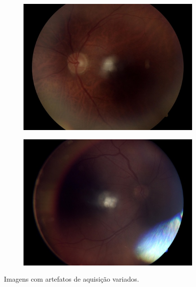 \documentclass[12pt]{article}
\begin{document}
\begin{figure}
\begin{subfigure}[b]{0.2\textwidth}
        \label{fig:images_variations_2_2}
    \end{subfigure}
    \hfill
    \begin{subfigure}[b]{0.2\textwidth}
        \centering
        \includegraphics[width=\textwidth]{images/examples_from_dataset/TRAIN049428.JPG}
        \label{fig:images_variations_2_3}
    \end{subfigure}
    \hfill
    \begin{subfigure}[b]{0.2\textwidth}
        \centering
        \includegraphics[width=\textwidth]{images/examples_from_dataset/TRAIN065536.JPG}
        \label{fig:images_variations_2_4}
    \end{subfigure}
    \caption{Imagens com artefatos de aquisição variados.}
    \label{fig:images_variations_2}
\end{figure}
\end{document}
